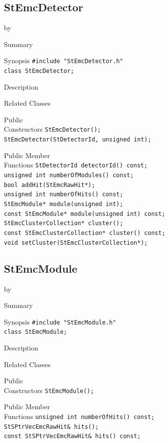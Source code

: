 \documentclass[twoside]{article}
\newcommand{\entrylabel}[1]{\mbox{\textbf{{#1}}}\hfil}%
\newenvironment{entry}
{\begin{list}{}%
    {\renewcommand{\makelabel}{\entrylabel}%
     \setlength{\labelwidth}{90pt}%
     \setlength{\leftmargin}{\labelwidth}
     \advance\leftmargin by \labelsep%
      }%
    }%
  {\end{list}}
\newcommand{\Entrylabel}[1]%
{\raisebox{0pt}[1ex][0pt]{\makebox[\labelwidth][l]%
    {\parbox[t]{\labelwidth}{\hspace{0pt}\textbf{{#1}}}}}}
\newenvironment{Entry}%
{\renewcommand{\entrylabel}{\Entrylabel}\begin{entry}}%
  {\end{entry}}
\begin{document}
\subsection{StEmcDetector}
\label{sec:StEmcDetector}
\begin{Entry}
\item[Summary]
\item[Synopsis]
    \verb+#include "StEmcDetector.h"+\\
    \verb+class StEmcDetector;+\\
\item[Description]
\item[Related Classes]
\item[Public\\ Constructors]
    \verb+StEmcDetector();+\\
    \verb+StEmcDetector(StDetectorId, unsigned int);+\\
\item[Public Member\\ Functions]
    \verb+StDetectorId detectorId() const;+\\
    \verb+unsigned int numberOfModules() const;+\\
    \verb+bool addHit(StEmcRawHit*);+\\
    \verb+unsigned int numberOfHits() const;+\\
    \verb+StEmcModule* module(unsigned int);+\\
    \verb+const StEmcModule* module(unsigned int) const;+\\
    \verb+StEmcClusterCollection* cluster();+\\
    \verb+const StEmcClusterCollection* cluster() const;+\\
    \verb+void setCluster(StEmcClusterCollection*);+\\
\end{Entry}
\clearpage


\subsection{StEmcModule}
\label{sec:StEmcModule}
\begin{Entry}
\item[Summary]
\item[Synopsis]
    \verb+#include "StEmcModule.h"+\\
    \verb+class StEmcModule;+\\
\item[Description]
\item[Related Classes]
\item[Public\\ Constructors]
    \verb+StEmcModule();+\\
\item[Public Member\\ Functions]
    \verb+unsigned int numberOfHits() const;+\\
    \verb+StSPtrVecEmcRawHit& hits();+\\
    \verb+const StSPtrVecEmcRawHit& hits() const;+\\
\end{Entry}
\clearpage
\end{document}
